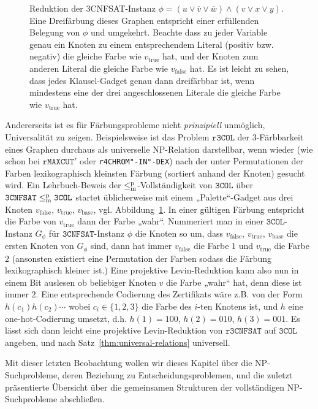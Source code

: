 \begin{figure}[t]
\begin{minipage}[t][7.9cm][t]{\textwidth}
\end{minipage}\par
    \caption{Reduktion der 3CNFSAT-Instanz $\phi=(u\lor \overline{v} \lor \overline{w}) \land (v\lor x\lor y)$. 
        Eine Dreifärbung dieses Graphen entspricht einer erfüllenden Belegung von $\phi$ und umgekehrt.
    Beachte dass zu jeder Variable genau ein Knoten zu einem entsprechendem Literal (positiv bzw. negativ) die gleiche Farbe wie $v_{\text{true}}$ hat, und der Knoten zum anderen Literal die gleiche Farbe wie $v_{\text{false}}$ hat. Es ist leicht zu sehen, dass jedes Klausel-Gadget genau dann dreifärbbar ist, wenn mindestens eine der drei angeschlossenen Literale die gleiche Farbe wie $v_{\text{true}}$ hat.}\label{fig:3col}
\end{figure}

Andererseits ist es für Färbungsprobleme nicht \emph{prinzipiell} unmöglich, Universalität zu zeigen. Beispielsweise ist das Problem $\mathtt{r3COL}$ der 3-Färbbarkeit eines Graphen durchaus als universelle NP-Relation darstellbar, wenn wieder (wie schon bei $\mathtt{rMAXCUT}'$ oder \texttt{r4CHROM"-IN"-DEX}) nach der unter Permutationen der Farben lexikographisch kleinsten Färbung (sortiert anhand der Knoten) gesucht wird.
Ein Lehrbuch-Beweis der $\leq_\mathrm{m}^\mathrm{p}$-Vollständigkeit von $\mathtt{3COL}$ über $\mathtt{3CNFSAT}\leq_\mathrm{m}^\mathrm{p}\mathtt{3COL}$ startet üblicherweise mit einem „Palette“-Gadget aus drei Knoten $v_{\text{false}}$, $ v_{\text{true}}$, $ v_{\text{base}}$, vgl. Abbildung~\ref{fig:3col}. In einer gültigen Färbung entspricht die Farbe von $v_{\text{true}}$ dann der Farbe „wahr“. Nummeriert man in einer $\mathtt{3COL}$-Instanz $G_\phi$ für $\mathtt{3CNFSAT}$-Instanz $\phi$ die Knoten  so  um, dass $v_{\text{false}}$, $ v_{\text{true}}$, $ v_{\text{base}}$ die ersten Knoten von $G_\phi$ sind, dann hat immer $v_{\text{false}}$ die Farbe $1$ und $v_{\text{true}}$ die Farbe $2$ (ansonsten existiert eine Permutation der Farben sodass die Färbung lexikographisch kleiner ist.)
Eine projektive Levin-Reduktion kann also nun in einem Bit auslesen ob beliebiger Knoten $v$ die Farbe „wahr“ hat, denn diese ist immer $2$.
Eine entsprechende Codierung des Zertifikats wäre z.B. von der Form $h(c_1)h(c_2)\cdots$ wobei $c_i\in\{1,2,3\}$ die Farbe des $i$-ten Knotens ist, und $h$ eine one-hot-Codierung umsetzt, d.h. $h(1)=100$, $h(2)=010$, $h(3)=001$. Es lässt sich dann leicht eine projektive Levin-Reduktion von $\mathtt{r3CNFSAT}$ auf $\mathtt{3COL}$ angeben, und nach Satz~\ref{thm:universal-relations} universell.

Mit dieser letzten Beobachtung wollen wir dieses Kapitel über die NP-Suchprobleme, deren Beziehung zu Entscheidungsproblemen, und die zuletzt präsentierte Übersicht über die gemeinsamen Strukturen der vollständigen NP-Suchprobleme abschließen. 



